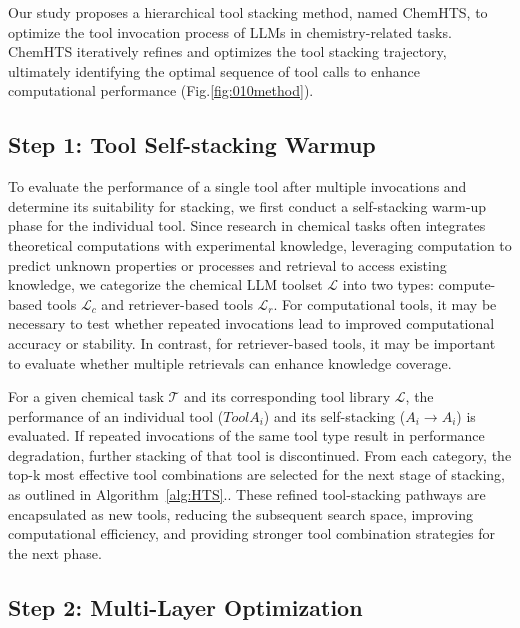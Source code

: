 Our study proposes a hierarchical tool stacking method, named ChemHTS, to optimize the tool invocation process of LLMs in chemistry-related tasks. ChemHTS iteratively refines and optimizes the tool stacking trajectory, ultimately identifying the optimal sequence of tool calls to enhance computational performance (Fig.\ref{fig:010method}).
\subsection{Step 1: Tool Self-stacking Warmup}

To evaluate the performance of a single tool after multiple invocations and determine its suitability for stacking, we first conduct a self-stacking warm-up phase for the individual tool.
Since research in chemical tasks often integrates theoretical computations with experimental knowledge, leveraging computation to predict unknown properties or processes and retrieval to access existing knowledge, we categorize the chemical LLM toolset $\mathcal{L}$ into two types: compute-based tools $\mathcal{L}_c$ and retriever-based tools $\mathcal{L}_r$.
For computational tools, it may be necessary to test whether repeated invocations lead to improved computational accuracy or stability. In contrast, for retriever-based tools, it may be important to evaluate whether multiple retrievals can enhance knowledge coverage.

For a given chemical task $\mathcal{T}$ and its corresponding tool library $\mathcal{L}$, the performance of an individual tool ($ToolA_i$) and its self-stacking ($A_i \to A_i$) is evaluated. If repeated invocations of the same tool type result in performance degradation, further stacking of that tool is discontinued. From each category, the top-k most effective tool combinations are selected for the next stage of stacking, as outlined in Algorithm~\ref{alg:HTS}.. 
These refined tool-stacking pathways are encapsulated as new tools, reducing the subsequent search space, improving computational efficiency, and providing stronger tool combination strategies for the next phase.
\subsection{Step 2: Multi-Layer Optimization}



